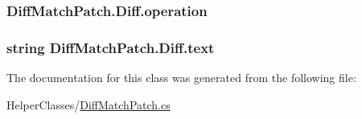 \subsubsection[{operation}]{ Diff\+Match\+Patch.\+Diff.\+operation}\label{class_diff_match_patch_1_1_diff_ae5a0db887ce3e79bd6cc180c8a15296f}
\hypertarget{class_diff_match_patch_1_1_diff_a8621592a1b31db7c21d605e50e1f558a}{}
\subsubsection[{text}]{\setlength{\rightskip}{0pt plus 5cm}string Diff\+Match\+Patch.\+Diff.\+text}\label{class_diff_match_patch_1_1_diff_a8621592a1b31db7c21d605e50e1f558a}


The documentation for this class was generated from the following file\+:\begin{DoxyCompactItemize}
\item 
Helper\+Classes/\hyperlink{_diff_match_patch_8cs}{Diff\+Match\+Patch.\+cs}\end{DoxyCompactItemize}
